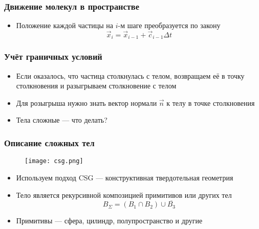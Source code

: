 \documentclass[onlymath]{beamer}
\begin{document}
\begin{frame}
  \frametitle{Движение молекул в пространстве}
  \begin{itemize}
  \item Положение каждой частицы на $i$-м шаге преобразуется по закону
    \begin{equation*}
      \vec{x}_i = \vec{x}_{i-1} + \vec{c}_{i-1} \Delta t
    \end{equation*}
  \end{itemize}
\end{frame}

\begin{frame}[fragile]
  \frametitle{Учёт граничных условий}
  \begin{itemize}
  \item Если оказалось, что частица столкнулась с телом, возвращаем её
    в точку столкновения и разыгрываем столкновение с телом
  \item Для розыгрыша нужно знать вектор нормали $\vec{n}$ к телу в
    точке столкновения
  \item Тела сложные — что делать?
  \end{itemize}
\end{frame}

\begin{frame}
  \frametitle{Описание сложных тел}
  \begin{figure}
    \centering
    \texttt{[image: csg.png]}
  \end{figure}
  \begin{itemize}
  \item Используем подход CSG — конструктивная твердотельная геометрия
  \item Тело является рекурсивной композицией примитивов или других
    тел
    \begin{equation}
      B_\Sigma = (B_1 \cap B_2) \cup \overline{B_3}
    \end{equation}
  \item Примитивы — сфера, цилиндр, полупространство и другие
  \end{itemize}
\end{frame}
\end{document}
